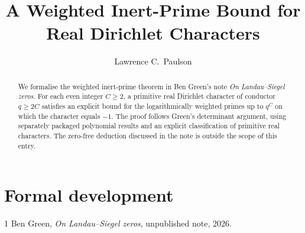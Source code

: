\documentclass[11pt,a4paper]{article}
\begin{document}
\title{A Weighted Inert-Prime Bound for Real Dirichlet Characters}
\author{Lawrence C.\ Paulson}
\maketitle

\begin{abstract}
We formalise the weighted inert-prime theorem in Ben Green's note
\emph{On Landau--Siegel zeros}. For each even integer \(C\geq 2\), a
primitive real Dirichlet character of conductor \(q\geq 2C\) satisfies an
explicit bound for the logarithmically weighted primes up to \(q^C\) on
which the character equals \(-1\). The proof follows Green's determinant
argument, using separately packaged polynomial results and an explicit
classification of primitive real characters.
The zero-free deduction discussed in the note is outside the scope of
this entry.
\end{abstract}

\section{Formal development}



\begin{thebibliography}{1}
Ben Green, \emph{On Landau--Siegel zeros}, unpublished note, 2026.
\end{thebibliography}
\end{document}
